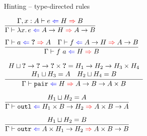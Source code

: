 \documentclass{beamer}
\begin{document}
\begin{frame}{Hinting -- type-directed rules}

\begin{center}
  $\infrule{\fullhinting{\extend{\Gamma}{x}{A}}{e}{H}{B}}{\hinting{\fun{x}{e}}{\Fun{A}{H}}{\Fun{A}{B}}}$

  \vspace{2em}

  $\infrule{\hinting{a}{\Hole}{A} \quad \hinting{f}{\Fun{A}{H}}{\Fun{A}{B}}}{\hinting{\app{f}{a}}{H}{B}}$

  \vspace{2em}

  $\infrule{\begin{array}{c} \sidecond{\hintlub{H}{\Fun{\Hole}{\Fun{\Hole}{\Prod{\Hole}{\Hole}}}} = \Fun{H_1}{\Fun{H_2}{\Prod{H_3}{H_4}}}} \\ \sidecond{\hintlub{H_1}{H_3} = A} \quad \sidecond{\hintlub{H_2}{H_4} = B} \end{array}}{\hinting{\funpair}{H}{\Fun{A}{\Fun{B}{\Prod{A}{B}}}}}$

  \vspace{2em}

  $\infrule{\sidecond{\hintlub{H_1}{H_2} = A}}{\hinting{\funoutl}{\Fun{\Prod{H_1}{B}}{H_2}}{\Fun{\Prod{A}{B}}{A}}}$

  \vspace{1em}

  $\infrule{\sidecond{\hintlub{H_1}{H_2} = B}}{\hinting{\funoutr}{\Fun{\Prod{A}{H_1}}{H_2}}{\Fun{\Prod{A}{B}}{B}}}$
\end{center}

\end{frame}
\end{document}
